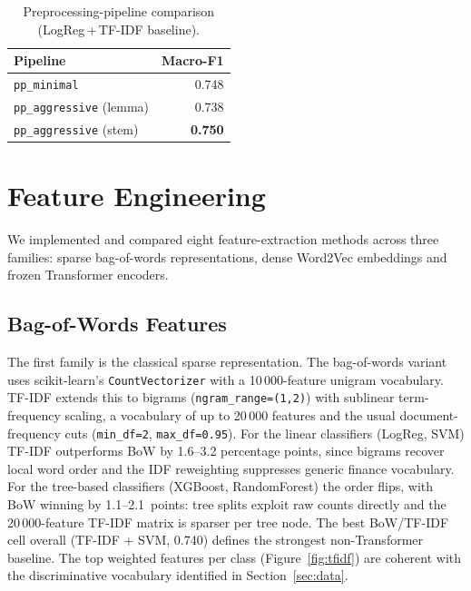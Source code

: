 \documentclass[12pt,a4paper]{article}
\begin{document}
\begin{table}[!htbp]
\centering
\begin{tabular}{lr}
\toprule
\textbf{Pipeline} & \textbf{Macro-F1} \\
\midrule
\texttt{pp\_minimal}              & 0.748 \\
\texttt{pp\_aggressive} (lemma)   & 0.738 \\
\texttt{pp\_aggressive} (stem)    & \textbf{0.750} \\
\bottomrule
\end{tabular}
\caption{Preprocessing-pipeline comparison (LogReg\,+\,TF-IDF baseline).}
\label{tab:pp_compare}
\end{table}

\section{Feature Engineering}
\label{sec:features}

We implemented and compared eight feature-extraction methods across three families: sparse bag-of-words representations, dense Word2Vec embeddings and frozen Transformer encoders.

\subsection{Bag-of-Words Features}

The first family is the classical sparse representation. The bag-of-words variant uses scikit-learn's \texttt{CountVectorizer} with a 10\,000-feature unigram vocabulary. TF-IDF extends this to bigrams (\texttt{ngram\_range=(1,2)}) with sublinear term-frequency scaling, a vocabulary of up to 20\,000 features and the usual document-frequency cuts (\texttt{min\_df=2}, \texttt{max\_df=0.95}). For the linear classifiers (LogReg, SVM) TF-IDF outperforms BoW by 1.6--3.2 percentage points, since bigrams recover local word order and the IDF reweighting suppresses generic finance vocabulary. For the tree-based classifiers (XGBoost, RandomForest) the order flips, with BoW winning by 1.1--2.1~points: tree splits exploit raw counts directly and the 20\,000-feature TF-IDF matrix is sparser per tree node. The best BoW/TF-IDF cell overall (TF-IDF + SVM, 0.740) defines the strongest non-Transformer baseline. The top weighted features per class (Figure~\ref{fig:tfidf}) are coherent with the discriminative vocabulary identified in Section~\ref{sec:data}.
\end{document}
